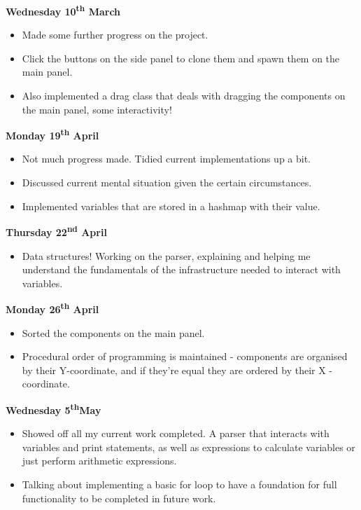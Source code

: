 \documentclass[a4paper, 12pt]{article}
\begin{document}
            \textbf{Wednesday 10\textsuperscript{th} March}
                \begin{itemize}
                    \item Made some further progress on the project.
                    \item Click the buttons on the side panel to clone them and spawn
                    them on the main panel.
                    \item Also implemented a drag class that deals with dragging the components
                    on the main panel, some interactivity! \\
                \end{itemize}
            \textbf{Monday 19\textsuperscript{th} April}
                \begin{itemize}
                    \item Not much progress made. Tidied current implementations up a bit.
                    \item Discussed current mental situation given the certain circumstances.
                    \item Implemented variables that are stored in a hashmap with their value.
                \end{itemize}
            \textbf{Thursday 22\textsuperscript{nd} April}
                \begin{itemize}
                    \item Data structures! Working on the parser, explaining and helping me
                    understand the fundamentals of the infrastructure needed to interact with
                    variables.
                \end{itemize}
            \textbf{Monday 26\textsuperscript{th} April}
                \begin{itemize}
                    \item Sorted the components on the main panel.
                    \item Procedural order of programming is maintained - components are organised
                    by their Y-coordinate, and if they're equal they are ordered by their X
                    -coordinate. \\
                \end{itemize}
            \textbf{Wednesday 5\textsuperscript{th}May}
                \begin{itemize}
                    \item Showed off all my current work completed. A parser that interacts with
                    variables and print statements, as well as expressions to calculate variables
                    or just perform arithmetic expressions.
                    \item Talking about implementing a basic for loop to have a foundation for
                    full functionality to be completed in future work.
                \end{itemize}
\end{document}
